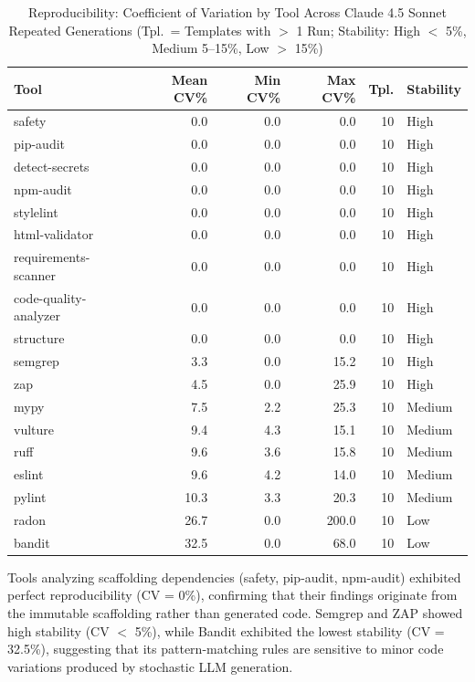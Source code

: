 \begin{table}[htbp]
    \centering
    \caption{Reproducibility: Coefficient of Variation by Tool Across Claude 4.5 Sonnet Repeated Generations (Tpl.\ = Templates with $>$ 1 Run; Stability: High $<$ 5\%, Medium 5--15\%, Low $>$ 15\%)}
    \label{tab:reproducibility}
    \small
    \begin{tabular}{@{} l r r r r l @{}}
        \toprule
        \textbf{Tool} & \textbf{Mean CV\%} & \textbf{Min CV\%} & \textbf{Max CV\%} & \textbf{Tpl.} & \textbf{Stability} \\
        \midrule
        safety & 0.0 & 0.0 & 0.0 & 10 & High \\
        pip-audit & 0.0 & 0.0 & 0.0 & 10 & High \\
        detect-secrets & 0.0 & 0.0 & 0.0 & 10 & High \\
        npm-audit & 0.0 & 0.0 & 0.0 & 10 & High \\
        stylelint & 0.0 & 0.0 & 0.0 & 10 & High \\
        html-validator & 0.0 & 0.0 & 0.0 & 10 & High \\
        requirements-scanner & 0.0 & 0.0 & 0.0 & 10 & High \\
        code-quality-analyzer & 0.0 & 0.0 & 0.0 & 10 & High \\
        structure & 0.0 & 0.0 & 0.0 & 10 & High \\
        semgrep & 3.3 & 0.0 & 15.2 & 10 & High \\
        zap & 4.5 & 0.0 & 25.9 & 10 & High \\
        mypy & 7.5 & 2.2 & 25.3 & 10 & Medium \\
        vulture & 9.4 & 4.3 & 15.1 & 10 & Medium \\
        ruff & 9.6 & 3.6 & 15.8 & 10 & Medium \\
        eslint & 9.6 & 4.2 & 14.0 & 10 & Medium \\
        pylint & 10.3 & 3.3 & 20.3 & 10 & Medium \\
        radon & 26.7 & 0.0 & 200.0 & 10 & Low \\
        bandit & 32.5 & 0.0 & 68.0 & 10 & Low \\
        \bottomrule
    \end{tabular}
\end{table}

Tools analyzing scaffolding dependencies (safety, pip-audit, npm-audit) exhibited perfect reproducibility (CV = 0\%), confirming that their findings originate from the immutable scaffolding rather than generated code. Semgrep and ZAP showed high stability (CV $<$ 5\%), while Bandit exhibited the lowest stability (CV = 32.5\%), suggesting that its pattern-matching rules are sensitive to minor code variations produced by stochastic LLM generation.

